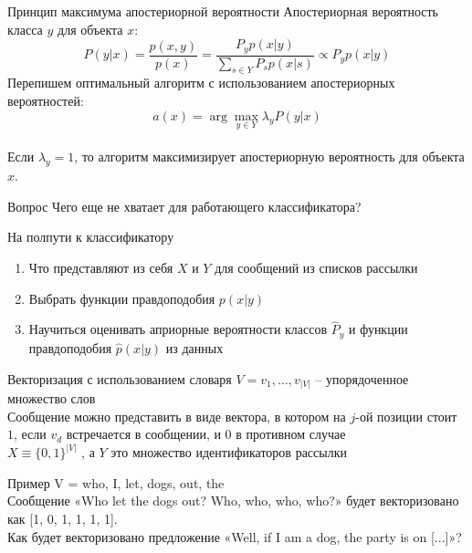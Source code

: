 \documentclass[10pt]{beamer}
\begin{document}
{
\begin{frame}{Принцип максимума апостериорной вероятности}
  Апостериорная вероятность класса $y$ для объекта $x$:
      $$
    P(y|x)
    = \dfrac{p(x, y)}{p(x)}
    = \dfrac{P_y p(x|y)}{\sum\limits_{s \in Y} P_s p(x|s)}
    \propto P_y p(x|y)
    $$
  \pause
  Перепишем оптимальный алгоритм с использованием апостериорных вероятностей:\\
  $$a(x) = \arg\max\limits_{y \in Y} \lambda_y P(y|x)$$\\
  \bigbreak
  Если $\lambda_y = 1$, то алгоритм максимизирует апостериорную вероятность для объекта $x$.
\end{frame}
}

\begin{frame}{Вопрос}
  \centering
  Чего еще не хватает для \alert{работающего} классификатора?
\end{frame}

\begin{frame} {На полпути к классификатору}
  \begin{enumerate} [<+->]
    \item Что представляют из себя $X$ и $Y$ для сообщений из списков рассылки
    \item Выбрать функции правдоподобия $p(x|y)$
    \item Научиться оценивать априорные вероятности классов $\hat{P}_y$ и функции правдоподобия $\hat{p}(x|y)$ из данных
  \end{enumerate}
\end{frame}

\begin{frame}{Векторизация с использованием словаря}
  $V = {v_1, \dots, v_{|V|}}$ -- упорядоченное множество слов\\
  \bigbreak
  Сообщение можно представить в виде вектора, в котором на $j$-ой позиции стоит $1$, если $v_d$ встречается в сообщении, и $0$ в противном случае\\
  \bigbreak
  $X\equiv \{0, 1\}^{|V|}$ , а $Y$ это множество идентификаторов рассылки
\end{frame}

\begin{frame}{Пример}
  V = {who, I, let, dogs, out, the}\\
  \pause
  \bigbreak
  Сообщение «Who let the dogs out? Who, who, who, who?» будет векторизовано как [1, 0, 1, 1, 1, 1].\\
  \pause
  \bigbreak
  Как будет векторизовано предложение «Well, if I am a dog, the party is on [...]»?
\end{frame}
\end{document}
